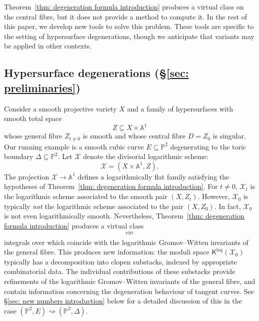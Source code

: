 \documentclass[11pt]{amsart}
\theoremstyle{definition}
\theoremstyle{definition}
\newcommand{\op}[1]{\operatorname{#1}}
\newcommand{\Aaff}{\mathbb{A}}
\newcommand{\PP}{\mathbb{P}}
\newcommand{\virt}{\op{virt}}
\newcommand{\Xcal}{\mathcal{X}}
\newcommand{\Kup}{\mathsf{K}}
\begin{document}
Theorem~\ref{thm: degeneration formula introduction} produces a virtual class on the central fibre, but it does not provide a method to compute it. In the rest of this paper, we develop new tools to solve this problem. These tools are specific to the setting of hypersurface degenerations, though we anticipate that variants may be applied in other contexts.

\subsection{Hypersurface degenerations (\S \ref{sec: preliminaries})} Consider a smooth projective variety $X$ and a family of hypersurfaces with smooth total space
\begin{equation*} Z \subseteq X \times \Aaff^{\! 1} \end{equation*}
whose general fibre $Z_{t \neq 0}$ is smooth and whose central fibre $D=Z_0$ is singular. Our running example is a smooth cubic curve $E \subseteq \PP^2$ degenerating to the toric boundary $\Delta \subseteq \PP^2$. Let $\Xcal$ denote the divisorial logarithmic scheme:
\begin{equation*} \Xcal = (X\times \Aaff^{\! 1},Z). \end{equation*}
The projection $\Xcal \to \Aaff^{\! 1}$ defines a logarithmically flat family satisfying the hypotheses of Theorem~\ref{thm: degeneration formula introduction}. For $t \neq 0$, $\Xcal_t$ is the logarithmic scheme associated to the smooth pair $(X,Z_t)$. However, $\Xcal_0$ is typically \emph{not} the logarithmic scheme associated to the pair $(X,Z_0)$. In fact, $\Xcal_0$ is not even logarithmically smooth. Nevertheless, Theorem~\ref{thm: degeneration formula introduction} produces a virtual class
\begin{equation*} [\Kup^{\log}(\Xcal_0)]^{\virt}\end{equation*}
integrals over which coincide with the logarithmic Gromov--Witten invariants of the general fibre. This produces new information: the moduli space $\Kup^{\log}(\Xcal_0)$ typically has a decomposition into clopen substacks, indexed by appropriate combinatorial data. The individual contributions of these substacks provide refinements of the logarithmic Gromov--Witten invariants of the general fibre, and contain information concerning the degeneration behaviour of tangent curves. See \S \ref{sec: new numbers introduction} below for a detailed discussion of this in the case $(\PP^2,E) \rightsquigarrow (\PP^2,\Delta)$.
\end{document}
